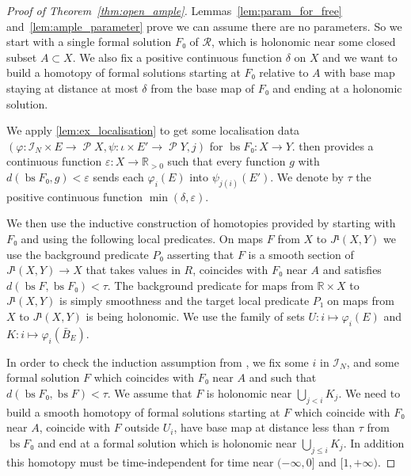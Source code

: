 \documentclass[10pt,a4paper]{article}
\newcommand{\co}{\!:}
\newcommand{\Rel}{\mathcal{R}} %
\DeclareMathOperator{\set}{\mathcal{P}} %
\DeclareMathOperator{\bs}{bs} %
\newcommand{\IT}[1]{\mathcal{I}_{#1}}
\newcommand{\uses}[1]{}
\newcommand{\proves}[1]{}
\newcommand{\leanok}{}
\begin{document}
\begin{proof}[Proof of Theorem~\ref{thm:open_ample}]
  \leanok
  \proves{thm:open_ample}
  \uses{lem:param_for_free, lem:ample_parameter, lem:transfer,
  lem:ex_localisation, lem:localisation_stability,
  lem:smooth_updating, lem:dist_updating, lem:inductive_htpy_construction,
  lem:ample_iff_loc, lem:h_principle_open_ample_loc}
  Lemmas~\ref{lem:param_for_free} and~\ref{lem:ample_parameter} prove we can
  assume there are no parameters. So we start with a single formal solution $F₀$
  of $\Rel$, which is holonomic near some closed subset $A ⊂ X$. We also
  fix a positive continuous function $δ$ on $X$ and we want to build a homotopy
  of formal solutions starting at $F₀$ relative to $A$ with base map staying at
  distance at most $δ$ from the base map of $F₀$ and ending at a holonomic
  solution.

  We apply \cref{lem:ex_localisation}  to get some
  localisation data $(φ \co \IT{N} × E → \set{X}, ψ \co ι × E' → \set{Y}, j)$ for
  $\bs F₀ : X → Y$.  then provides a continuous
  function $ε : X → ℝ_{> 0}$ such that every function $g$ with $d(\bs F₀, g) < ε$
  sends each $φ_i(E)$ into $ψ_{j(i)}(E')$. We denote by $τ$ the positive
  continuous function $\min(δ, ε)$.

  We then use the inductive construction of homotopies provided by
   starting with $F₀$ and
  using the following local predicates. On maps $F$ from $X$ to $J¹(X, Y)$ we
  use the background predicate $P₀$ asserting that $F$ is a smooth section of
  $J¹(X, Y) → X$ that takes values in $R$, coincides with $F₀$ near $A$ and
  satisfies $d(\bs F, \bs F₀) < τ$. The background
  predicate for maps from $ℝ × X$ to $J¹(X, Y)$ is simply smoothness and the
  target local predicate $P₁$ on maps from $X$ to $J¹(X, Y)$ is being holonomic.
  We use the family of sets $U \co i ↦ φ_i(E)$ and $K \co i ↦ φ_i(\bar{B}_E)$.

  In order to check the induction assumption from
  , we fix some
  $i$ in $\IT{N}$, and some formal solution $F$ which coincides with $F₀$ near
  $A$ and such that $d(\bs F₀, \bs F) < τ$. We assume that $F$ is holonomic near
  $\bigcup_{j < i} K_j$. We need to build a smooth homotopy of formal solutions
  starting at $F$ which coincide with $F₀$ near $A$, coincide with $F$ outside
  $U_i$, have base map at distance less than $τ$ from $\bs F₀$ and end at a
  formal solution which is holonomic near $\bigcup_{j ≤ i} K_j$. In addition this
  homotopy must be time-independent for time near $(-∞, 0]$ and $[1, +∞)$.


\end{proof}
\end{document}
